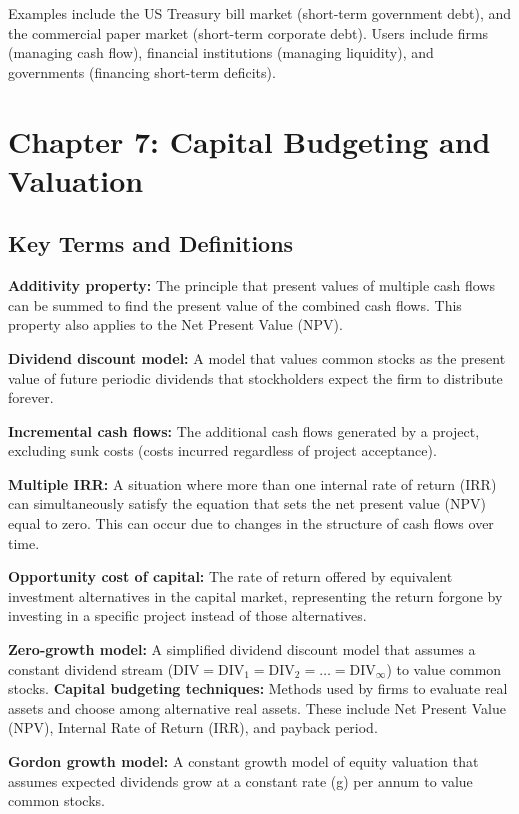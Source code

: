 \documentclass[twoside,openany]{book}
\begin{document}
Examples include the US Treasury bill market (short-term government debt), and the commercial paper market (short-term corporate debt). Users include firms (managing cash flow), financial institutions (managing liquidity), and governments (financing short-term deficits).

\chapter*{Chapter 7: Capital Budgeting and Valuation}

\section*{\textbf{Key Terms and Definitions}}

\textbf{Additivity property:} The principle that present values of multiple cash flows can be summed to find the present value of the combined cash flows. This property also applies to the Net Present Value (NPV).

\textbf{Dividend discount model:} A model that values common stocks as the present value of future periodic dividends that stockholders expect the firm to distribute forever.

\textbf{Incremental cash flows:} The additional cash flows generated by a project, excluding sunk costs (costs incurred regardless of project acceptance).

\textbf{Multiple IRR:} A situation where more than one internal rate of return (IRR) can simultaneously satisfy the equation that sets the net present value (NPV) equal to zero. This can occur due to changes in the structure of cash flows over time.

\textbf{Opportunity cost of capital:} The rate of return offered by equivalent investment alternatives in the capital market, representing the return forgone by investing in a specific project instead of those alternatives.

\textbf{Zero-growth model:} A simplified dividend discount model that assumes a constant dividend stream 
(\(\text{DIV} = \text{DIV}_1 = \text{DIV}_2 = \ldots = \text{DIV}_\infty\)) to value common stocks.
\textbf{Capital budgeting techniques:} Methods used by firms to evaluate real assets and choose among alternative real assets. These include Net Present Value (NPV), Internal Rate of Return (IRR), and payback period.

\textbf{Gordon growth model:} A constant growth model of equity valuation that assumes expected dividends grow at a constant rate (g) per annum to value common stocks.
\end{document}
